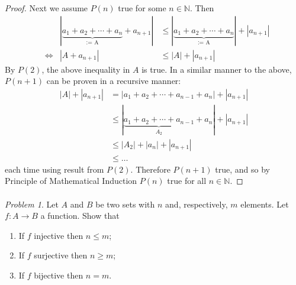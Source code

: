 \documentclass[11pt,twoside, reqno, align]{amsart}
\theoremstyle{remark}
\newtheorem{Prob}{Problem}
\def\N{\mathbb N}
\renewcommand{\iff}{\Leftrightarrow}
\begin{document}
\begin{proof}
Next we assume $P(n)$ true for some $n \in \N$. Then
\begin{align*}
    &  & |\underbrace{a_1+a_2+\cdots+a_n}_\text{:= A} + a_{n+1}| & \leq |\underbrace{a_1+a_2+\cdots+a_n}_\text{:= A}| + |a_{n+1}| \\
    & \iff & |A + a_{n+1}| & \leq |A| + |a_{n+1}|
\end{align*}
By $P(2)$, the above inequality in $A$ is true. In a similar manner to the above, $P(n+1)$ can be proven in a recursive manner:
\begin{align*}
    |A| + |a_{n+1}| & = |a_1 + a_2 + \cdots + a_{n-1} + a_n| + |a_{n+1}| \\
    & \leq |\underbrace{a_1 + a_2 + \cdots + a_{n-1}}_\text{$A_2$} + a_n| + |a_{n+1}| \\
    & \leq |A_2| + |a_n| + |a_{n+1}| \\
    & \leq \ldots
\end{align*}
each time using result from $P(2)$. Therefore $P(n+1)$ true, and so by Principle of Mathematical Induction $P(n)$ true for all $n \in \N$.
\end{proof}

\paragraph{}

\begin{Prob}
Let $A$ and $B$ be two sets with $n$ and, respectively, $m$ elements. Let $f:A\to B$ a function. Show that

\begin{enumerate}
\item If $f$ injective then $n\leq m$;
\item If $f$ surjective then $n\geq m$;
\item If $f$ bijective then $n=m$.
\end{enumerate}
\end{Prob}
\end{document}
